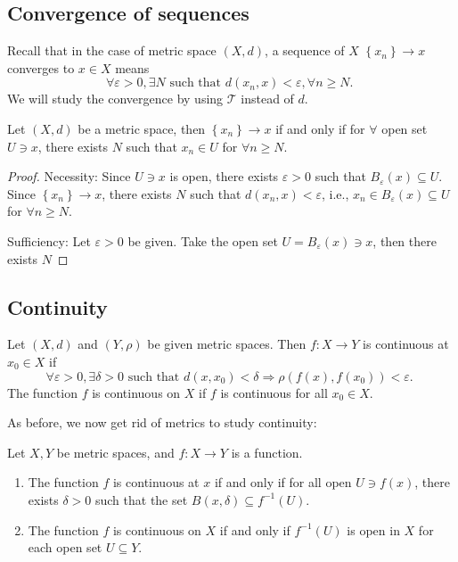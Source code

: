 \subsection{Convergence of sequences}
Recall that in the case of metric space $(X, d)$, a sequence of $X$ \(\left\{  {x}_{n}\right\} \rightarrow  x\) converges to $x \in X$ means
\[
\forall \varepsilon  > 0,\exists N\text{ such that }d\left( {{x}_{n},x}\right)  < \varepsilon,\forall n \geq  N\text{. }
\]
We will study the convergence by using $\mathcal{T}$ instead of $d$.

\begin{proposition} Let \((X,d)\) be a metric space, then \(\left\{  {x}_{n}\right\}  \rightarrow  x\) if and only if for \(\forall\) open set \(U \ni  x\), there exists \(N\) such that \({x}_{n} \in  U\) for \(\forall n \geq  N\).
\end{proposition}

\begin{proof} Necessity: Since \(U \ni  x\) is open, there exists \(\varepsilon  > 0\) such that \({B}_{\varepsilon }\left( x\right)  \subseteq  U\).
Since \(\left\{  {x}_{n}\right\}   \rightarrow  x\), there exists \(N\) such that \(d\left( {{x}_{n},x}\right)  < \varepsilon\), i.e., \({x}_{n} \in  {B}_{\varepsilon }\left( x\right)  \subseteq  U\) for \(\forall n \geq  N\).

Sufficiency: Let \(\varepsilon  > 0\) be given. Take the open set \(U = {B}_{\varepsilon }\left( x\right)  \ni  x\), then there exists \(N\)
\end{proof}

\subsection{Continuity}
\begin{definition}[Continuity] Let $(X, d)$ and \(\left( {Y,\rho }\right)\) be given metric spaces. Then \(f : X \rightarrow  Y\) is continuous at \({x}_{0} \in  X\) if
\[
\forall \varepsilon  > 0,\exists \delta  > 0\text{ such that }d\left( {x,{x}_{0}}\right)  < \delta  \Rightarrow  \rho \left( {f\left( x\right),f\left( {x}_{0}\right) }\right)  < \varepsilon \text{. }
\]
The function \(f\) is continuous on \(X\) if \(f\) is continuous for all \({x}_{0} \in  X\).
\end{definition}

As before, we now get rid of metrics to study continuity:
\begin{proposition} \label{prop:metric_cont_map} Let $X, Y$ be metric spaces, and $f:X \to Y$ is a function. 

\begin{enumerate}
    \item The function \(f\) is continuous at \(x\) if and only if for all open \(U \ni  f\left( x\right)\), there exists \(\delta  > 0\) such that the set \(B\left( {x,\delta }\right)  \subseteq  {f}^{-1}\left( U\right)\).

\item The function \(f\) is continuous on \(X\) if and only if \({f}^{-1}\left( U\right)\) is open in \(X\) for each open set \(U \subseteq  Y\).
\end{enumerate}
\end{proposition}

